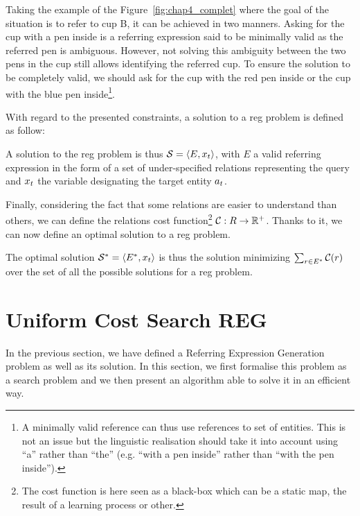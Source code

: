 Taking the example of the Figure~\ref{fig:chap4_complet} where the goal of the situation is to refer to cup B, it can be achieved in two manners. Asking for the cup with a pen inside is a referring expression said to be minimally valid as the referred pen is ambiguous. However, not solving this ambiguity between the two pens in the cup still allows identifying the referred cup. To ensure the solution to be completely valid, we should ask for the cup with the red pen inside or the cup with the blue pen inside\footnote{A minimally valid reference can thus use references to set of entities. This is not an issue but the linguistic realisation should take it into account using ``a'' rather than ``the'' (e.g. ``with a pen inside'' rather than ``with the pen inside'').}.

\newpage

With regard to the presented constraints, a solution to a \acrshort{reg} problem is defined as follow:

\begin{definition}
A solution to the \acrshort{reg} problem is thus $\mathcal{S} = \langle E, x_t \rangle$, with $E$ a valid referring expression in the form of a set of under-specified relations representing the \sparql{} query and $x_t$ the variable designating the target entity $a_t$.
\end{definition}


Finally, considering the fact that some relations are easier to understand than others, we can define the relations cost function\footnote{The cost function is here seen as a black-box which can be a static map, the result of a learning process or other.} $\mathcal{C} : R \rightarrow \mathbb{R}^+$. Thanks to it, we can now define an optimal solution to a \acrshort{reg} problem.

\begin{definition}
The optimal solution $\mathcal{S}^* = \langle E^*, x_t \rangle$ is thus the solution minimizing $\sum_{r \in E^*} \mathcal{C}(r)$ over the set of all the possible solutions for a \acrshort{reg} problem.
\end{definition}


\section{Uniform Cost Search REG}

In the previous section, we have defined a Referring Expression Generation problem as well as its solution. In this section, we first formalise this problem as a search problem and we then present an algorithm able to solve it in an efficient way.

